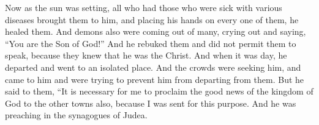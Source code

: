\begin{biblechapter}
\verse Now as the sun was setting, all who had those who were sick with various diseases brought them to him, and placing his hands on every one of them, he healed them.
\verse And demons also were coming out of many, crying out and saying, “You are the Son of God!” And he rebuked them and did not permit them to speak, because they knew that he was the Christ.
\verse And when it was day, he departed and went to an isolated place. And the crowds were seeking him, and came to him and were trying to prevent him from departing from them.
\verse But he said to them, “It is necessary for me to proclaim the good news of the kingdom of God to the other towns also, because I was sent for this purpose.
\verse And he was preaching in the synagogues of Judea.
\end{biblechapter}

